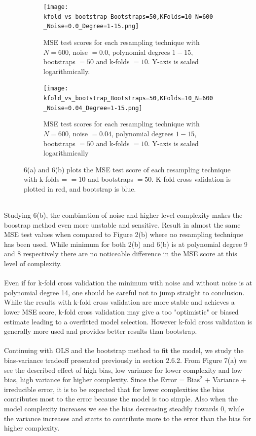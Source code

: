 \documentclass[a4paper,twocolumn]{article}
\begin{document}
\begin{figure}[ht]
    \centering
    \begin{subfigure}[b]{0.9\columnwidth}
        \texttt{[image: kfold\_vs\_bootstrap\_Bootstraps=50,KFolds=10\_N=600\_Noise=0.0\_Degree=1-15.png]}
        \caption{MSE test scores for each resampling technique with $N = 600$, noise $= 0.0$, polynomial degrees $1- 15$, bootstraps $= 50$ and k-folds $= 10$. Y-axis is scaled logarithmically.}
    \end{subfigure}
    
    \begin{subfigure}[b]{0.9\columnwidth}
        \texttt{[image: kfold\_vs\_bootstrap\_Bootstraps=50,KFolds=10\_N=600\_Noise=0.04\_Degree=1-15.png]}
        \caption{MSE test scores for each resampling technique with $N = 600$, noise $= 0.04$, polynomial degrees $1- 15$, bootstraps $= 50$ and k-folds $= 10$. Y-axis is scaled logarithmically}
    \end{subfigure}
    \caption{6(a) and 6(b) plots the MSE test score of each resampling technique with k-folds = $=10$ and bootstraps $= 50$. K-fold cross validation is plotted in red, and bootstrap is blue.}
\end{figure}\\
Studying 6(b), the combination of noise and higher level complexity makes the boostrap method even more unstable and sensitive. Result in almost the same MSE test values when compared to Figure 2(b) where no resampling technique has been used. While minimum for both 2(b) and 6(b) is at polynomial degree 9 and 8 respectively there are no noticeable difference in the MSE score at this level of complexity. \\
\\
Even if for k-fold cross validation the minimum with noise and without noise is at polynomial degree 14, one should be careful not to jump straight to conclusion. While the results with k-fold cross validation are more stable and achieves a lower MSE score, k-fold cross validation may give a too "optimistic" or biased estimate leading to a overfitted model selection\cite{kfold1, kfold2}. However k-fold cross validation is generally more used and provides better results than bootstrap.\\
\\
Continuing with OLS and the bootstrap method to fit the model, we study the bias-variance tradeoff presented previously in section 2.6.2. From Figure 7(a) we see the described effect of high bias, low variance for lower complexity and low bias, high variance for higher complexity. Since the Error = $\textrm{Bias}^{2}$ + Variance + irreducible error, it is to be expected that for lower complexities the bias contributes most to the error because the model is too simple. Also when the model complexity increases we see the bias decreasing steadily towards 0, while the variance increases and starts to contribute more to the error than the bias for higher complexity.\\
\end{document}
